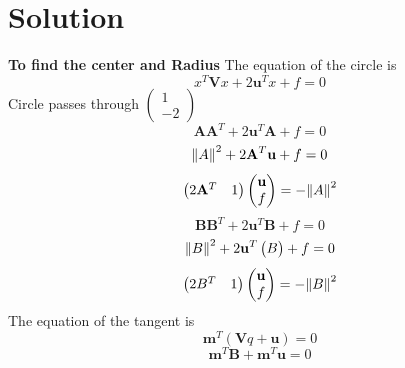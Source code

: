 \documentclass[10pt, a4paper]{article}
\newcommand{\myvec}[1]{\ensuremath{\begin{pmatrix}#1\end{pmatrix}}}
\let\vec\mathbf
\begin{document}
\section{Solution}
\textbf{To find the center and Radius}
The equation of the circle is 
\begin{equation}
	x^T\vec{V}x + 2\vec{u}^Tx + f = 0
\end{equation}
Circle passes through $\myvec{1\\-2}$ 
\begin{equation}
	\vec{A}\vec{A}^T + 2\vec{u}^T\vec{A} + f = 0
\end{equation}
\begin{equation}
	\norm{A}^2 + 2\vec{A}^T \vec{u} + f = 0
\end{equation}
\begin{equation}
	\myvec{2\vec{A}^T & 1}\myvec{\vec{u} \\ f} = -\norm{A}^2 
\end{equation}
\begin{equation}
	\vec{B}\vec{B}^T + 2\vec{u}^T\vec{B} + f = 0
\end{equation}
\begin{equation}
	\norm{B}^2 + 2\vec{u}^T\myvec{B} + f = 0
\end{equation}
\begin{equation}
	\myvec{2B^T & 1}\myvec{\vec{u} \\ f} = -\norm{B}^2
\end{equation}
The equation of the tangent is
\begin{equation}
	\vec{m}^T (\vec{V}q + \vec{u}) = 0
\end{equation}
\begin{equation}
	\vec{m}^T\vec{B} +\vec{m}^T\vec{u} = 0
\end{equation}
\end{document}
